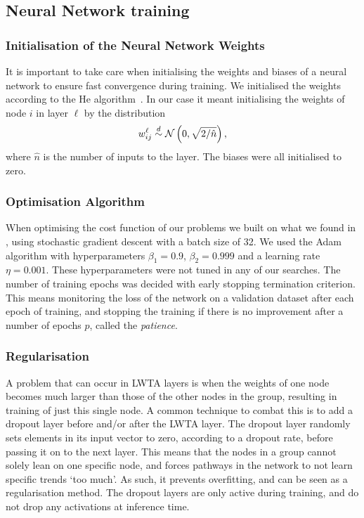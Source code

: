 \subsection{Neural Network training}

    \subsubsection{Initialisation of the Neural Network Weights}
        It is important to take care when initialising the weights and biases of a neural network to ensure fast convergence during training. We initialised the weights according to the He algorithm~\citep{He}. In our case it meant initialising the weights of node $i$ in layer $\ell$ by the distribution
        \begin{align}
            w^\ell_{ij} \overset{d}{\sim} \operatorname{\mathcal{N}}\left(0,\sqrt{2/\hat{n}}\right),
        \end{align}
        where $\hat{n}$ is the number of inputs to the layer. The biases were all initialised to zero.

    \subsubsection{Optimisation Algorithm}
        When optimising the cost function of our problems we built on what we found in \citep{Project2}, using stochastic gradient descent with a batch size of 32. We used the Adam algorithm with hyperparameters $\beta_1 = 0.9$, $\beta_2 = 0.999$ and a learning rate $\eta = 0.001$. These hyperparameters were not tuned in any of our searches. The number of training epochs was decided with early stopping termination criterion. This means monitoring the loss of the network on a validation dataset after each epoch of training, and stopping the training if there is no improvement after a number of epochs $p$, called the \textit{patience}.


    \subsubsection{Regularisation}

        A problem that can occur in LWTA layers is when the weights of one node becomes much larger than those of the other nodes in the group, resulting in training of just this single node. A common technique to combat this is to add a dropout layer before and/or after the LWTA layer. The dropout layer randomly sets elements in its input vector to zero, according to a dropout rate, before passing it on to the next layer. This means that the nodes in a group cannot solely lean on one specific node, and forces pathways in the network to not learn specific trends `too much'. As such, it prevents overfitting, and can be seen as a regularisation method. The dropout layers are only active during training, and do not drop any activations at inference time.

